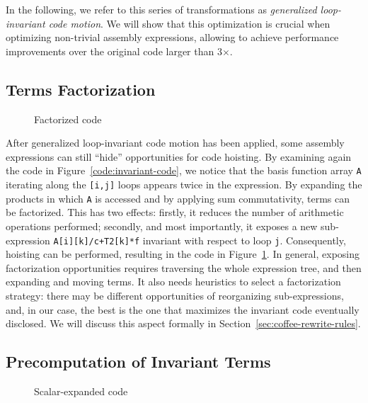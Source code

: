 In the following, we refer to this series of transformations as \textit{generalized loop-invariant code motion}. We will show that this optimization is crucial when optimizing non-trivial assembly expressions, allowing to achieve performance improvements over the original code larger than 3$\times$.


\subsection{Terms Factorization}
\label{sec:coffee-factorize}

\begin{figure}
\centering
\label{code:factorized-code}
\footnotesize

\caption{Factorized code}
\end{figure}

After generalized loop-invariant code motion has been applied, some assembly expressions can still  ``hide'' opportunities for code hoisting. By examining again the code in Figure~\ref{code:invariant-code}, we notice that the basis function array \texttt{A} iterating along the \texttt{[i,j]} loops appears twice in the expression. By expanding the products in which \texttt{A} is accessed and by applying sum commutativity, terms can be factorized. This has two effects: firstly, it reduces the number of arithmetic operations performed; secondly, and most importantly, it exposes a new sub-expression \texttt{A[i][k]/c+T2[k]*f} invariant with respect to loop \texttt{j}. Consequently, hoisting can be performed, resulting in the code in Figure~\ref{code:factorized-code}. In general, exposing factorization opportunities requires traversing the whole expression tree, and then expanding and moving terms. It also needs heuristics to select a factorization strategy: there may be different opportunities of reorganizing sub-expressions, and, in our case, the best is the one that maximizes the invariant code eventually disclosed. We will discuss this aspect formally in Section~\ref{sec:coffee-rewrite-rules}.

\subsection{Precomputation of Invariant Terms}
\label{sec:coffee-precompute}

\begin{figure}
\centering
\label{code:scalarexp-code}
\footnotesize

\caption{Scalar-expanded code}
\end{figure}

